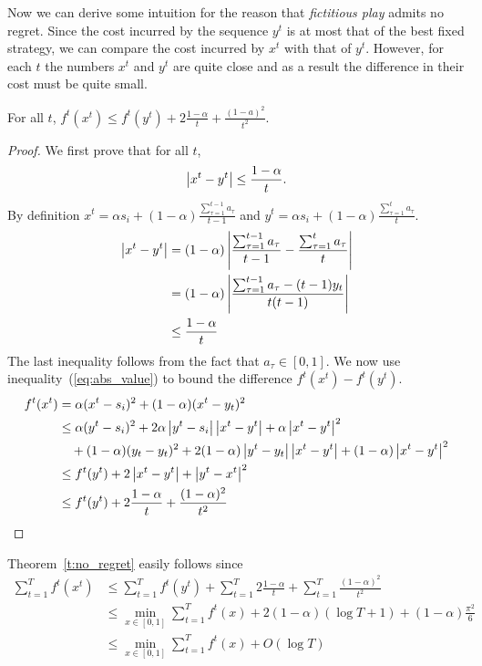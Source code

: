 Now we can derive some intuition for the reason that \emph{fictitious play}
admits no regret. Since the cost incurred by the sequence $y^t$ is at most that
of the best fixed strategy, we can compare the cost incurred by $x^t$ with
that of $y^t$.  However, for each $t$ the numbers $x^t$ and $y^t$ are quite
close and as a result the difference in their cost must be quite small.

\begin{lemma}
  For all $t$,
  \(f^t(x^t) \leq f^t(y^t) + 2\frac{1-\alpha}{t} + \frac{(1-a)^2}{t^2}\).
\end{lemma}
\begin{proof}
  We first prove that for all $t$,
  \begin{equation}\label{eq:abs_value}
    \left|x^t - y^t \right| \leq \frac{1-\alpha}{t}.
  \end{equation}
  By definition
  \(x^t = \alpha s_i + (1-\alpha)\frac{\sum_{\tau = 1}^{t-1} a_\tau}{t-1}\)
  and
  \( y^t = \alpha s_i + (1-\alpha)\frac{\sum_{\tau = 1}^t a_\tau}{t}\).
  \begin{align*}
    \left|x^t - y^t\right|
    &=
    (1-\alpha)\left|\frac{\sum_{\tau = 1}^{t-1}a_\tau}{t-1}
    - \frac{\sum_{\tau = 1}^t a_\tau}{t}\right|\\
    &=
    (1-\alpha)\left|\frac{\sum_{\tau = 1}^{t-1}a_\tau -(t-1)y_t}{t(t-1)}\right|\\
    &\leq
    \frac{1-\alpha}{t}
  \end{align*}
  The last inequality follows from the fact that $a_\tau \in [0,1]$.
  We now use inequality~(\ref{eq:abs_value}) to bound the difference
  \( f^t(x^t) - f^t(y^t) \).
  \begin{align*}
    f^t(x^t)
    &=
    \alpha(x^t - s_i)^2 + (1 - \alpha)(x^t - y_t)^2 \\
    &\leq
    \alpha(y^t - s_i)^2 + 2\alpha\left|y^t -
    s_i\right|\left|x^t - y^t\right| + \alpha \left|x^t - y^t\right|^2 \\
    &\quad + (1-\alpha)(y_t - y_t)^2 +
    2(1-\alpha)\left|y^t - y_t\right|\left|x^t-y^t\right| + (1 - \alpha)\left|x^t - y^t\right|^2\\
    &\leq
    f^t(y^t) + 2\left|x^t - y^t\right| + \left|y^t - x^t\right|^2\\
    &\leq
    f^t(y^t) + 2\frac{1-\alpha}{t} + \frac{(1-\alpha)^2}{t^2}
  \end{align*}
\end{proof}

Theorem~\ref{t:no_regret} easily follows since
\begin{align*}
  \sum_{t=1}^T f^t(x^t)
  &\leq
  \sum_{t=1}^T f^t(y^t) + \sum_{t=1}^T 2\frac{1-\alpha}{t} +
  \sum_{t=1}^T \frac{(1-\alpha)^2}{t^2}\\
  &\leq
  \min_{x \in [0,1]} \sum_{t=1}^T f^t(x) +
  2(1-\alpha)(\log T + 1) + (1-\alpha)\frac{\pi^2}{6}\\
  &\leq
  \min_{x \in [0,1]} \sum_{t=1}^T f^t(x) + O(\log T)
\end{align*}
